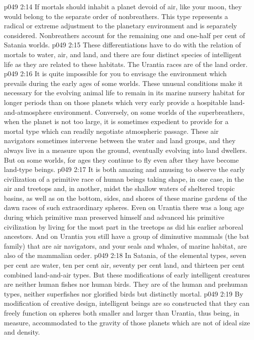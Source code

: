 \vs p049 2:14 If mortals should inhabit a planet devoid of air, like your moon, they would belong to the separate order of nonbreathers. This type represents a radical or extreme adjustment to the planetary environment and is separately considered. Nonbreathers account for the remaining one and one\hyp{}half per cent of Satania worlds.
\pc \vs p049 2:15 \bibnobreakspace {} These differentiations have to do with the relation of mortals to water, air, and land, and there are four distinct species of intelligent life as they are related to these habitats. The Urantia races are of the land order.
\vs p049 2:16 It is quite impossible for you to envisage the environment which prevails during the early ages of some worlds. These unusual conditions make it necessary for the evolving animal life to remain in its marine nursery habitat for longer periods than on those planets which very early provide a hospitable land\hyp{}and\hyp{}atmosphere environment. Conversely, on some worlds of the superbreathers, when the planet is not too large, it is sometimes expedient to provide for a mortal type which can readily negotiate atmospheric passage. These air navigators sometimes intervene between the water and land groups, and they always live in a measure upon the ground, eventually evolving into land dwellers. But on some worlds, for ages they continue to fly even after they have become land\hyp{}type beings.
\vs p049 2:17 It is both amazing and amusing to observe the early civilization of a primitive race of human beings taking shape, in one case, in the air and treetops and, in another, midst the shallow waters of sheltered tropic basins, as well as on the bottom, sides, and shores of these marine gardens of the dawn races of such extraordinary spheres. Even on Urantia there was a long age during which primitive man preserved himself and advanced his primitive civilization by living for the most part in the treetops as did his earlier arboreal ancestors. And on Urantia you still have a group of diminutive mammals (the bat family) that are air navigators, and your seals and whales, of marine habitat, are also of the mammalian order.
\vs p049 2:18 In Satania, of the elemental types, seven per cent are water, ten per cent air, seventy per cent land, and thirteen per cent combined land\hyp{}and\hyp{}air types. But these modifications of early intelligent creatures are neither human fishes nor human birds. They are of the human and prehuman types, neither superfishes nor glorified birds but distinctly mortal.
\pc \vs p049 2:19 \bibnobreakspace {} By modification of creative design, intelligent beings are so constructed that they can freely function on spheres both smaller and larger than Urantia, thus being, in measure, accommodated to the gravity of those planets which are not of ideal size and density.
